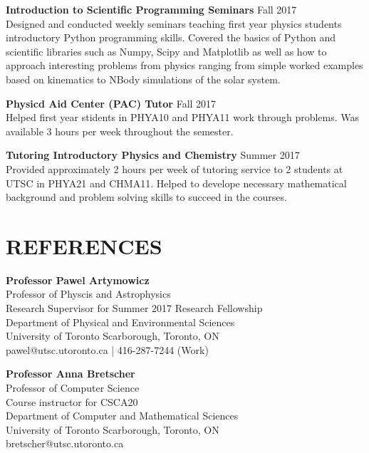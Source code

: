 \documentclass[line, margin]{res}
\begin{document}
\begin{resume}
  \textbf{Introduction to Scientific Programming Seminars} \hfill Fall 2017 \\ [7pt]
    Designed and conducted weekly seminars teaching first year physics students
    introductory Python programming skills. Covered the basics of Python and scientific
    libraries such as Numpy, Scipy and Matplotlib as well as how to approach interesting
    problems from physics ranging from simple worked examples based on kinematics to
    NBody simulations of the solar system. 

  \textbf{Physicd Aid Center (PAC) Tutor} \hfill Fall 2017 \\ [7pt]
    Helped first year stidents in PHYA10 and PHYA11 work through problems.
    Was available 3 hours per week throughout the semester.

  \textbf{Tutoring Introductory Physics and Chemistry} \hfill Summer 2017 \\ [7pt]
    Provided approximately 2 hours per week of tutoring service to 2 students at UTSC
    in PHYA21 and CHMA11. Helped to develope necessary mathematical background and problem
    solving skills to succeed in the courses.

  \section{REFERENCES}
  \textbf{Professor Pawel Artymowicz} \\
  Professor of Physcis and Astrophysics \\ [7pt]
  Research Supervisor for Summer 2017 Research Fellowship \\
  Department of Physical and Environmental Sciences \\
  University of Toronto Scarborough, Toronto, ON \\
  pawel@utsc.utoronto.ca | 416-287-7244 (Work)

  \textbf{Professor Anna Bretscher} \\
  Professor of Computer Science \\ [7pt]
  Course instructor for CSCA20 \\
  Department of Computer and Mathematical Sciences \\
  University of Toronto Scarborough, Toronto, ON \\
  bretscher@utsc.utoronto.ca

\end{resume}
\end{document}
